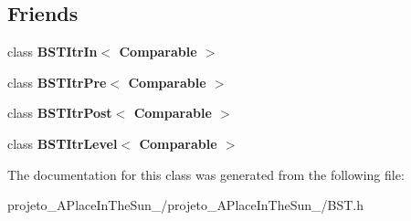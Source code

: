 \subsection*{Friends}
\begin{DoxyCompactItemize}
\item 
\hypertarget{class_b_s_t_aab3993acac2ab24a0b59edb0c3acc775}{}\label{class_b_s_t_aab3993acac2ab24a0b59edb0c3acc775} 
class {\bfseries B\+S\+T\+Itr\+In$<$ Comparable $>$}
\item 
\hypertarget{class_b_s_t_a45a55df6f11541416d4ea7684c575c1a}{}\label{class_b_s_t_a45a55df6f11541416d4ea7684c575c1a} 
class {\bfseries B\+S\+T\+Itr\+Pre$<$ Comparable $>$}
\item 
\hypertarget{class_b_s_t_a5dc153694be266f6e772659486219da7}{}\label{class_b_s_t_a5dc153694be266f6e772659486219da7} 
class {\bfseries B\+S\+T\+Itr\+Post$<$ Comparable $>$}
\item 
\hypertarget{class_b_s_t_a26ff00bc0d87069aed877f10fd3c80a8}{}\label{class_b_s_t_a26ff00bc0d87069aed877f10fd3c80a8} 
class {\bfseries B\+S\+T\+Itr\+Level$<$ Comparable $>$}
\end{DoxyCompactItemize}


The documentation for this class was generated from the following file\+:\begin{DoxyCompactItemize}
\item 
projeto\+\_\+\+A\+Place\+In\+The\+Sun\+\_/projeto\+\_\+\+A\+Place\+In\+The\+Sun\+\_/B\+S\+T.\+h\end{DoxyCompactItemize}
